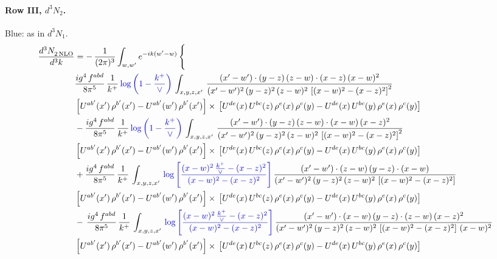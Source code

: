 \documentclass[10pt]{article}
\numberwithin{equation}{section}
\newcommand{\new}[1]{{\color{blue}#1}}
\begin{document}
\paragraph{Row III, $d^3N_2$.}
\new{Blue}: as in $d^3N_1$.
\begin{align}
   \frac{d^{3}N_{2\,\rm NLO}^{\rm}}{d^{3}k}  & =  -\,\frac{1}{(2\pi)^{3}}  \int_{w, w^\prime} e^{-ik(w^\prime-w)}\, \Bigg\{\notag \\
&  \frac{ig^{4}\, f^{abd}}{8\pi^{5}}\, \frac{1}{k^{+}}\,\new{\log{\left(1-\frac{k^{+}}{\vee}\right)}}\, \int_{x,y,z,x'}\,\frac{(x'-w')\cdot  (y-z)\, (z-w)\cdot (x-z)\, (x-w)^{2}}{(x'-w')^{2}\, (y-z)^{2}\, (z-w)^{2}\,\left[(x-w)^{2}-(x-z)^{2}\right]^{2}}\, \notag \\ & \left[U^{ab'}(x')\,\rho^{b'}(x')-U^{ab'}(w')\, \rho^{b'}(x')\right]\times\,\left[U^{de}(x)\,U^{bc}(z)\, \rho^{e}(x)\,\rho^{c}(y)-U^{de}(x)\,U^{bc}(y)\,\rho^{e}(x)\,\rho^{c}(y)\right] \notag \\
&   - \frac{ig^{4}\, f^{abd}}{8\pi^{5}}\, \frac{1}{k^{+}}\,\new{\log{\left(1-\frac{k^{+}}{\vee}\right)}}\, \int_{x,y,z,x'}\,\frac{(x'-w')\cdot  (y-z)\, (z-w)\cdot (x-w)\, (x-z)^{2}}{(x'-w')^{2}\, (y-z)^{2}\, (z-w)^{2}\,\left[(x-w)^{2}-(x-z)^{2}\right]^{2}}\, \notag \\ & \left[U^{ab'}(x')\,\rho^{b'}(x')-U^{ab'}(w')\, \rho^{b'}(x')\right]\times\,\left[U^{de}(x)\,U^{bc}(z)\, \rho^{e}(x)\,\rho^{c}(y)-U^{de}(x)\,U^{bc}(y)\,\rho^{e}(x)\,\rho^{c}(y)\right] \notag \\
&  + \frac{ig^{4}\, f^{abd}}{8\pi^{5}}\, \frac{1}{k^{+}}\, \int_{x,y,z,x'}\,\new{\log{\left[\frac{(x-w)^{2}\,\frac{k^{+}}{\vee}-(x-z)^{2}}{(x-w)^{2}-(x-z)^{2}}\right]}}\,\frac{(x'-w')\cdot (z-w)\, (y-z)\cdot (x-w)}{(x'-w')^{2}\, (y-z)^{2}\, (z-w)^{2}\,\left[(x-w)^{2}-(x-z)^{2}\right]}\, \notag \\ & \left[U^{ab'}(x')\,\rho^{b'}(x')-U^{ab'}(w')\, \rho^{b'}(x')\right]\times\,\left[U^{de}(x)\,U^{bc}(z)\, \rho^{e}(x)\,\rho^{c}(y)-U^{de}(x)\,U^{bc}(y)\,\rho^{e}(x)\,\rho^{c}(y)\right] \notag \\
& -\,\frac{ig^{4}\, f^{abd}}{8\pi^{5}}\, \frac{1}{k^{+}}\, \int_{x,y,z,x'}\,\new{\log{\left[\frac{(x-w)^{2}\,\frac{k^{+}}{\vee}-(x-z)^{2}}{(x-w)^{2}-(x-z)^{2}}\right]}}\,\frac{(x'-w')\cdot (x-w)\, (y-z)\cdot(z-w)\,(x-z)^{2}}{(x'-w')^{2}\, (y-z)^{2}\, (z-w)^{2}\,\left[(x-w)^{2}-(x-z)^{2}\right]\,(x-w)^{2}}\, \notag \\ & \left[U^{ab'}(x')\,\rho^{b'}(x')-U^{ab'}(w')\, \rho^{b'}(x')\right]\times\,\left[U^{de}(x)\,U^{bc}(z)\, \rho^{e}(x)\,\rho^{c}(y)-U^{de}(x)\,U^{bc}(y)\,\rho^{e}(x)\,\rho^{c}(y)\right] \notag \\

\end{align}
\end{document}

